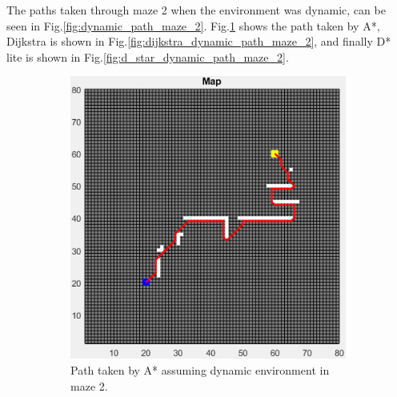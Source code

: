 
The paths taken through maze 2 when the environment was dynamic, can be seen in Fig.\:\ref{fig:dynamic_path_maze_2}. Fig.\:\ref{fig:a_star_dynamic_path_maze_2} shows the path taken by A*, Dijkstra is shown in Fig.\:\ref{fig:dijkstra_dynamic_path_maze_2}, and finally D* lite is shown in Fig.\:\ref{fig:d_star_dynamic_path_maze_2}.

\begin{figure}
	\centering
    \begin{subfigure}[t]{0.32\columnwidth}
		\centering
		\includegraphics[width=\textwidth]{images/a_star_dynamic_maze_2.png}
		\caption{Path taken by A* assuming dynamic environment in maze 2.}
        \label{fig:a_star_dynamic_path_maze_2}
	\end{subfigure}
    \hfill
	\begin{subfigure}[t]{0.32\columnwidth}
		\centering

\end{subfigure}
\end{figure}
